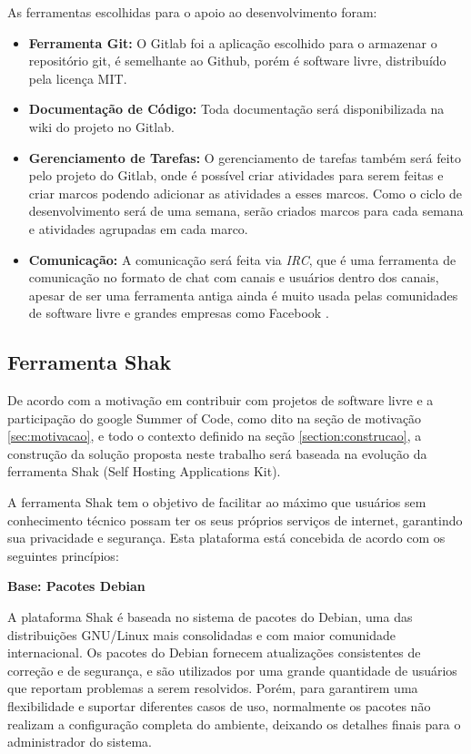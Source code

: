 As ferramentas escolhidas para o apoio ao desenvolvimento foram:
\begin{itemize}
  \item \textbf{Ferramenta Git:} O Gitlab foi a aplicação escolhido para o armazenar o
  repositório git, é semelhante ao Github, porém é software livre, distribuído pela
  licença MIT\cite{gitlab}.
  \item \textbf{Documentação de Código:} Toda documentação será disponibilizada
  na wiki do projeto no Gitlab.
  \item \textbf{Gerenciamento de Tarefas:} O gerenciamento de tarefas também será
  feito pelo projeto do Gitlab, onde é possível criar atividades para serem feitas
  e criar marcos podendo adicionar as atividades a esses marcos. Como o ciclo de
  desenvolvimento será de uma semana, serão criados marcos para cada semana e atividades
  agrupadas em cada marco.
  \item \textbf{Comunicação:} A comunicação será feita via \textit{IRC}, que é uma ferramenta
  de comunicação no formato de chat com canais e usuários dentro dos canais,
  apesar de ser uma ferramenta antiga ainda é muito usada pelas comunidades de software
  livre e grandes empresas como Facebook \cite{artigofacebook}.
\end{itemize}

\subsection{Ferramenta Shak}

De acordo com a motivação em contribuir com projetos de software livre
e a participação do google Summer of Code, como dito na seção de motivação
\ref{sec:motivacao}, e todo o contexto definido na seção \ref{section:construcao},
a construção da solução proposta neste trabalho será baseada na evolução da ferramenta Shak 
(Self Hosting Applications Kit).

A ferramenta Shak tem o objetivo de facilitar ao máximo que usuários sem conhecimento
técnico possam ter os seus próprios serviços de internet, garantindo sua privacidade
e segurança. Esta plataforma está concebida de acordo com os seguintes princípios:

\textbf{Base: Pacotes Debian}

A plataforma Shak é baseada no sistema de pacotes do Debian, uma das distribuições GNU/Linux mais consolidadas e com maior comunidade internacional. Os
pacotes do Debian fornecem atualizações consistentes de correção e de segurança,
e são utilizados por uma grande quantidade de usuários que reportam problemas a
serem resolvidos. Porém, para garantirem uma flexibilidade e suportar diferentes
casos de uso, normalmente os pacotes não realizam a configuração completa do ambiente,
deixando os detalhes finais para o administrador do sistema.

